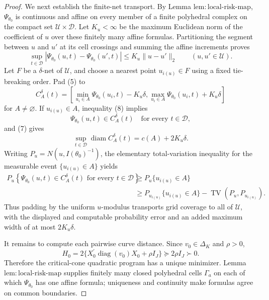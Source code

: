 \documentclass{article}
\begin{document}
\begin{proof}
We next establish the finite-net transport.  By Lemma \(\mathrm{lem:local\mbox{-}risk\mbox{-}map}\), \(\Psi_{\theta_0}\) is continuous and affine on every member of a finite polyhedral complex on the compact set \(\mathcal U\times\mathcal D\).  Let \(K_u<\infty\) be the maximum Euclidean norm of the coefficient of \(u\) over these finitely many affine formulas.  Partitioning the segment between \(u\) and \(u'\) at its cell crossings and summing the affine increments proves
\[
 \sup_{t\in\mathcal D}
 \left|\Psi_{\theta_0}(u,t)-\Psi_{\theta_0}(u',t)\right|
 \leq K_u\lVert u-u'\rVert_2
 \qquad (u,u'\in\mathcal U).
\tag{8}
\]
Let \(F\) be a \(\delta\)-net of \(\mathcal U\), and choose a nearest point \(u_{i(u)}\in F\) using a fixed tie-breaking order.  Pad (5) to
\[
 C_A^\delta(t)=
 \left[
   \min_{u_i\in A}\Psi_{\theta_0}(u_i,t)-K_u\delta,
   \max_{u_i\in A}\Psi_{\theta_0}(u_i,t)+K_u\delta
 \right]
\tag{9}
\]
for \(A\ne\varnothing\).  If \(u_{i(u)}\in A\), inequality (8) implies
\[
 \Psi_{\theta_0}(u,t)\in C_A^\delta(t)
 \quad\text{for every }t\in\mathcal D,
\tag{10}
\]
and (7) gives
\[
 \sup_{t\in\mathcal D}\operatorname{diam}C_A^\delta(t)
 =c(A)+2K_u\delta.
\tag{11}
\]
Writing \(P_u=N(u,I(\theta_0)^{-1})\), the elementary total-variation inequality for the measurable event \(\{u_{i(u)}\in A\}\) yields
\[
\begin{aligned}
 P_u\!\left\{
   \Psi_{\theta_0}(u,t)\in C_A^\delta(t)
   \text{ for every }t\in\mathcal D\right\}
 &\geq P_u\{u_{i(u)}\in A\}\\
 &\geq P_{u_{i(u)}}\{u_{i(u)}\in A\}
   -\operatorname{TV}(P_u,P_{u_{i(u)}}).
\end{aligned}
\tag{12}
\]
Thus padding by the uniform \(u\)-modulus transports grid coverage to all of \(\mathcal U\), with the displayed and computable probability error and an added maximum width of at most \(2K_u\delta\).

It remains to compute each pairwise curve distance.  Since \(v_0\in\Delta_K\) and \(\rho>0\),
\[
 H_0=2\{X_0^{\prime}\operatorname{diag}(v_0)X_0+\rho I_J\}
 \succeq 2\rho I_J\succ0.
\tag{13}
\]
Therefore the critical-cone quadratic program has a unique minimizer.  Lemma \(\mathrm{lem:local\mbox{-}risk\mbox{-}map}\) supplies finitely many closed polyhedral cells \(\Gamma_a\) on each of which \(\Psi_{\theta_0}\) has one affine formula; uniqueness and continuity make formulas agree on common boundaries.


\end{proof}
\end{document}
